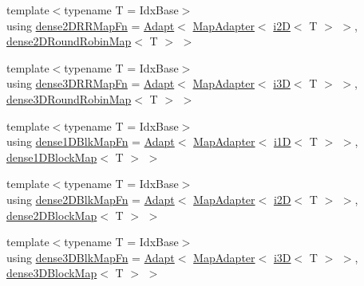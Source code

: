\begin{DoxyCompactItemize}
\item 
{\footnotesize template$<$typename T  = Idx\+Base$>$ }\\using \hyperlink{namespacevt_1_1mapping_a6038870f6fcb87803b82114c71e6aa9b}{dense2\+D\+R\+R\+Map\+Fn} = \hyperlink{namespacevt_1_1mapping_ab3efa0ad45a85d80210d4acef3bb6c22}{Adapt}$<$ \hyperlink{namespacevt_1_1mapping_a41b113c28bb6430fbcb5be66e08ccf9f}{Map\+Adapter}$<$ \hyperlink{namespacevt_1_1mapping_a6448c875e0807b43f31e96fc5b0cec04}{i2D}$<$ T $>$ $>$, \hyperlink{namespacevt_1_1mapping_ac606a5886c93a4dbb05dfead285c30c6}{dense2\+D\+Round\+Robin\+Map}$<$ T $>$ $>$
\item 
{\footnotesize template$<$typename T  = Idx\+Base$>$ }\\using \hyperlink{namespacevt_1_1mapping_acdcf6cb63043d58e9c50144bdc8b59dd}{dense3\+D\+R\+R\+Map\+Fn} = \hyperlink{namespacevt_1_1mapping_ab3efa0ad45a85d80210d4acef3bb6c22}{Adapt}$<$ \hyperlink{namespacevt_1_1mapping_a41b113c28bb6430fbcb5be66e08ccf9f}{Map\+Adapter}$<$ \hyperlink{namespacevt_1_1mapping_af435b967b9ed1ccb5ec4effdbd9abd13}{i3D}$<$ T $>$ $>$, \hyperlink{namespacevt_1_1mapping_aa48fa3b830b637787c584dbac5bba6db}{dense3\+D\+Round\+Robin\+Map}$<$ T $>$ $>$
\item 
{\footnotesize template$<$typename T  = Idx\+Base$>$ }\\using \hyperlink{namespacevt_1_1mapping_a433597bc51c453de93aeb1312676c70c}{dense1\+D\+Blk\+Map\+Fn} = \hyperlink{namespacevt_1_1mapping_ab3efa0ad45a85d80210d4acef3bb6c22}{Adapt}$<$ \hyperlink{namespacevt_1_1mapping_a41b113c28bb6430fbcb5be66e08ccf9f}{Map\+Adapter}$<$ \hyperlink{namespacevt_1_1mapping_af0c14a9a77e0311b3d089143ed93ba76}{i1D}$<$ T $>$ $>$, \hyperlink{namespacevt_1_1mapping_a2d49151f03d4ce393b01c620f6b18517}{dense1\+D\+Block\+Map}$<$ T $>$ $>$
\item 
{\footnotesize template$<$typename T  = Idx\+Base$>$ }\\using \hyperlink{namespacevt_1_1mapping_adfd6b43dd7e4a4dbb66ee9065ca4bc3a}{dense2\+D\+Blk\+Map\+Fn} = \hyperlink{namespacevt_1_1mapping_ab3efa0ad45a85d80210d4acef3bb6c22}{Adapt}$<$ \hyperlink{namespacevt_1_1mapping_a41b113c28bb6430fbcb5be66e08ccf9f}{Map\+Adapter}$<$ \hyperlink{namespacevt_1_1mapping_a6448c875e0807b43f31e96fc5b0cec04}{i2D}$<$ T $>$ $>$, \hyperlink{namespacevt_1_1mapping_aca20bcd20c24f4a43e217ca63bf5812c}{dense2\+D\+Block\+Map}$<$ T $>$ $>$
\item 
{\footnotesize template$<$typename T  = Idx\+Base$>$ }\\using \hyperlink{namespacevt_1_1mapping_af947e4c94da260154c26fdca517f1a79}{dense3\+D\+Blk\+Map\+Fn} = \hyperlink{namespacevt_1_1mapping_ab3efa0ad45a85d80210d4acef3bb6c22}{Adapt}$<$ \hyperlink{namespacevt_1_1mapping_a41b113c28bb6430fbcb5be66e08ccf9f}{Map\+Adapter}$<$ \hyperlink{namespacevt_1_1mapping_af435b967b9ed1ccb5ec4effdbd9abd13}{i3D}$<$ T $>$ $>$, \hyperlink{namespacevt_1_1mapping_a91764d84e5e6d8253872740cb8424726}{dense3\+D\+Block\+Map}$<$ T $>$ $>$

\end{DoxyCompactItemize}

